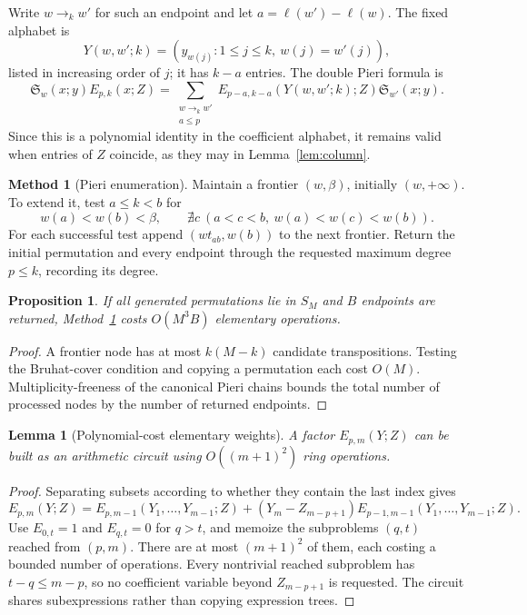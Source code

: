 \documentclass{amsart}
\newtheorem{proposition}[theorem]{Proposition}
\newtheorem{lemma}[theorem]{Lemma}
\theoremstyle{definition}
\newtheorem{method}[theorem]{Method}
\theoremstyle{remark}
\numberwithin{equation}{section}
\newcommand{\Sch}{\mathfrak S}
\begin{document}
Write $w\longrightarrow_k w'$ for such an endpoint and let
$a=\ell(w')-\ell(w)$.
The fixed alphabet is
\[
 Y(w,w';k)=(y_{w(j)}:1\leq j\leq k,\ w(j)=w'(j)),
\]
listed in increasing order of $j$; it has $k-a$ entries.
The double Pieri formula \cite[Theorem~7.1]{samuelmolev} is
\begin{equation}\label{eq:pieri}
 \Sch_w(x;y)E_{p,k}(x;Z)
 =\sum_{\substack{w\longrightarrow_k w'\\ a\leq p}}
     E_{p-a,k-a}(Y(w,w';k);Z)\Sch_{w'}(x;y).
\end{equation}
Since this is a polynomial identity in the coefficient alphabet,
it remains valid when entries of $Z$ coincide, as they may in
Lemma~\ref{lem:column}.

\begin{method}[Pieri enumeration]\label{method:pieri}
Maintain a frontier $(w,\beta)$, initially $(w,+\infty)$.
To extend it, test $a\leq k<b$ for
\[
 w(a)<w(b)<\beta,\qquad
 \nexists c\ (a<c<b,\ w(a)<w(c)<w(b)).
\]
For each successful test append $(wt_{ab},w(b))$ to the next frontier.
Return the initial permutation and every endpoint through the requested
maximum degree $p\leq k$, recording its degree.
\end{method}

\begin{proposition}\label{prop:pieriwork}
If all generated permutations lie in $S_M$ and $B$ endpoints are
returned, Method~\ref{method:pieri} costs $O(M^3B)$ elementary operations.
\end{proposition}
\begin{proof}
A frontier node has at most $k(M-k)$ candidate transpositions.
Testing the Bruhat-cover condition and copying a permutation each cost
$O(M)$.
Multiplicity-freeness of the canonical Pieri chains bounds the total
number of processed nodes by the number of returned endpoints.
\end{proof}

\begin{lemma}[Polynomial-cost elementary weights]\label{lem:weight}
A factor $E_{p,m}(Y;Z)$ can be built as an arithmetic circuit using
$O((m+1)^2)$ ring operations.
\end{lemma}
\begin{proof}
Separating subsets according to whether they contain the last index gives
\begin{equation}\label{eq:weightrec}
 E_{p,m}(Y;Z)=E_{p,m-1}(Y_1,\ldots,Y_{m-1};Z)
 +(Y_m-Z_{m-p+1})
     E_{p-1,m-1}(Y_1,\ldots,Y_{m-1};Z).
\end{equation}
Use $E_{0,t}=1$ and $E_{q,t}=0$ for $q>t$, and memoize the
subproblems $(q,t)$ reached from $(p,m)$.
There are at most $(m+1)^2$ of them, each costing a bounded number
of operations.
Every nontrivial reached subproblem has $t-q\leq m-p$,
so no coefficient variable beyond $Z_{m-p+1}$ is requested.
The circuit shares subexpressions rather than copying expression trees.
\end{proof}
\end{document}
